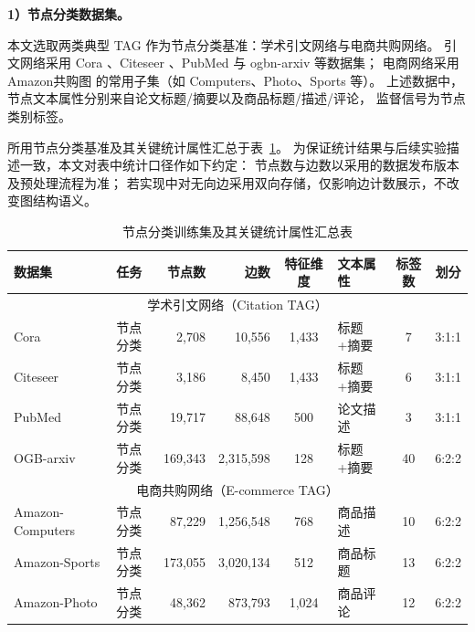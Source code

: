 \textbf{1）节点分类数据集。}

本文选取两类典型 TAG 作为节点分类基准：{学术引文网络}与{电商共购网络}。
引文网络采用 Cora \cite{McCallum2000AutomatingTC}、Citeseer \cite{Giles1998CiteSeerAA}、PubMed \cite{Sen2008CollectiveCI}
与 ogbn-arxiv \cite{Hu2020OpenGB} 等数据集；
电商网络采用 Amazon共购图 \cite{Wan2018ItemRO} 的常用子集（如 Computers、Photo、Sports 等）。
上述数据中，节点文本属性分别来自论文标题/摘要以及商品标题/描述/评论，
监督信号为节点类别标签。

所用节点分类基准及其关键统计属性汇总于表~\ref{tab:dataset_properties}。
为保证统计结果与后续实验描述一致，本文对表中统计口径作如下约定：
节点数与边数以采用的数据发布版本及预处理流程为准；
若实现中对无向边采用双向存储，仅影响边计数展示，不改变图结构语义。

\begin{table}[htbp]
\centering
\caption{节点分类训练集及其关键统计属性汇总表}
\label{tab:dataset_properties}
\small
\setlength{\tabcolsep}{3.5pt}
\renewcommand{\arraystretch}{1.15}
\begin{tabular}{llrrclcc}
\toprule
\textbf{数据集} & \textbf{任务} & \textbf{节点数} & \textbf{边数} &
\textbf{特征维度} & \textbf{文本属性} & \textbf{标签数} & \textbf{划分} \\
\midrule
\multicolumn{8}{c}{{学术引文网络（Citation TAG）}}\\
\midrule
Cora      & 节点分类 & 2,708   & 10,556    & 1,433 & 标题+摘要 & 7  & 3:1:1 \\
Citeseer  & 节点分类 & 3,186   & 8,450     & 1,433 & 标题+摘要 & 6  & 3:1:1 \\
PubMed    & 节点分类 & 19,717  & 88,648    & 500   & 论文描述  & 3  & 3:1:1 \\
OGB-arxiv & 节点分类 & 169,343 & 2,315,598 & 128   & 标题+摘要 & 40 & 6:2:2 \\
\midrule
\multicolumn{8}{c}{{电商共购网络（E-commerce TAG）}}\\
\midrule
Amazon-Computers & 节点分类 & 87,229  & 1,256,548 & 768  & 商品描述 & 10 & 6:2:2 \\
Amazon-Sports    & 节点分类 & 173,055 & 3,020,134 & 512  & 商品标题 & 13 & 6:2:2 \\
Amazon-Photo     & 节点分类 & 48,362  & 873,793   & 1,024& 商品评论 & 12 & 6:2:2 \\
\bottomrule
\end{tabular}
\end{table}

